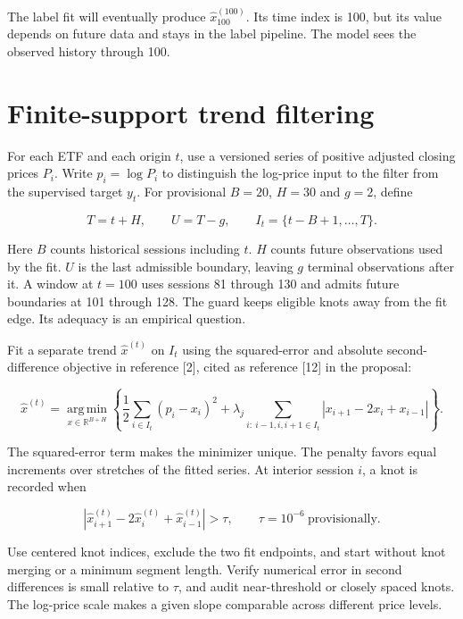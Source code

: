 \documentclass[10pt,letterpaper]{article}
\begin{document}
The label fit will eventually produce \(\widehat x^{(100)}_{100}\). Its time index is 100, but its value depends on future data and stays in the label pipeline. The model sees the observed history through 100.\par

\clearpage

\section{Finite-support trend filtering}

For each ETF and each origin \(t\), use a versioned series of positive adjusted closing prices \(P_i\). Write \(p_i=\log P_i\) to distinguish the log-price input to the filter from the supervised target \(y_t\). For provisional \(B=20\), \(H=30\) and \(g=2\), define\par

\[
T=t+H,\qquad U=T-g,\qquad I_t=\{t-B+1,\ldots,T\}.
\]

Here \(B\) counts historical sessions including \(t\). \(H\) counts future observations used by the fit. \(U\) is the last admissible boundary, leaving \(g\) terminal observations after it. A window at \(t=100\) uses sessions 81 through 130 and admits future boundaries at 101 through 128. The guard keeps eligible knots away from the fit edge. Its adequacy is an empirical question.\par

Fit a separate trend \(\widehat x^{(t)}\) on \(I_t\) using the squared-error and absolute second-difference objective in reference [2], cited as reference [12] in the proposal:\par

\[
\widehat x^{(t)}
=\operatorname*{arg\,min}_{x\in\mathbb R^{B+H}}
\left\{\frac12\sum_{i\in I_t}(p_i-x_i)^2
+\lambda_j\!\!\sum_{i:\ i-1,i,i+1\in I_t}
  |x_{i+1}-2x_i+x_{i-1}|\right\}.
\]

The squared-error term makes the minimizer unique. The penalty favors equal increments over stretches of the fitted series. At interior session \(i\), a knot is recorded when\par

\[
\left|\widehat x^{(t)}_{i+1}-2\widehat x^{(t)}_i+\widehat x^{(t)}_{i-1}\right|>\tau,
\qquad \tau=10^{-6}\ \text{provisionally}.
\]

Use centered knot indices, exclude the two fit endpoints, and start without knot merging or a minimum segment length. Verify numerical error in second differences is small relative to \(\tau\), and audit near-threshold or closely spaced knots. The log-price scale makes a given slope comparable across different price levels.\par
\end{document}

